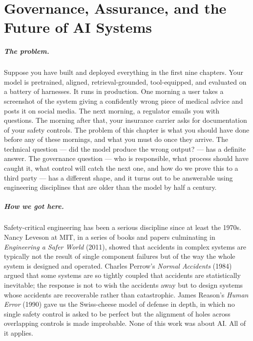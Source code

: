 \chapter{Governance, Assurance, and the Future of AI Systems}
\label{chap:governance}

\scenelabel
\begin{scenestrip}
\end{scenestrip}

\paragraph{The problem.}
Suppose you have built and deployed everything in the first nine
chapters. Your model is pretrained, aligned, retrieval-grounded,
tool-equipped, and evaluated on a battery of harnesses. It runs in
production. One morning a user takes a screenshot of the system
giving a confidently wrong piece of medical advice and posts it on
social media. The next morning, a regulator emails you with
questions. The morning after that, your insurance carrier asks for
documentation of your safety controls. The problem of this chapter
is what you should have done before any of these mornings, and what
you must do once they arrive. The technical question --- did the
model produce the wrong output? --- has a definite answer. The
governance question --- who is responsible, what process should
have caught it, what control will catch the next one, and how do
we prove this to a third party --- has a different shape, and it
turns out to be answerable using engineering disciplines that are
older than the model by half a century.

\paragraph{How we got here.}
Safety-critical engineering has been a serious discipline since at
least the 1970s. Nancy Leveson at MIT, in a series of books and
papers culminating in \emph{Engineering a Safer World} (2011),
showed that accidents in complex systems are typically not the
result of single component failures but of the way the whole system
is designed and operated. Charles Perrow's \emph{Normal Accidents}
(1984) argued that some systems are so tightly coupled that
accidents are statistically inevitable; the response is not to wish
the accidents away but to design systems whose accidents are
recoverable rather than catastrophic. James Reason's
\emph{Human Error} (1990) gave us the Swiss-cheese model of
defense in depth, in which no single safety control is asked to be
perfect but the alignment of holes across overlapping controls is
made improbable. None of this work was about AI. All of it applies.

